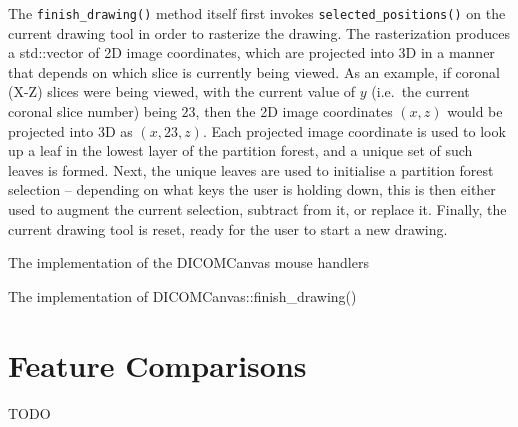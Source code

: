 The \texttt{finish_drawing()} method itself first invokes \texttt{selected_positions()} on the current drawing tool in order to rasterize the drawing. The rasterization produces a std::vector of 2D image coordinates, which are projected into 3D in a manner that depends on which slice is currently being viewed. As an example, if coronal (X-Z) slices were being viewed, with the current value of $y$ (i.e.~the current coronal slice number) being $23$, then the 2D image coordinates $(x,z)$ would be projected into 3D as $(x,23,z)$. Each projected image coordinate is used to look up a leaf in the lowest layer of the partition forest, and a unique set of such leaves is formed. Next, the unique leaves are used to initialise a partition forest selection -- depending on what keys the user is holding down, this is then either used to augment the current selection, subtract from it, or replace it. Finally, the current drawing tool is reset, ready for the user to start a new drawing.

\begin{stulisting}[p]
\caption{The implementation of the DICOMCanvas mouse handlers}
\label{code:appendixval-mousehandlers}

\end{stulisting}

\begin{stulisting}[p]
\caption{The implementation of DICOMCanvas::finish_drawing()}
\label{code:appendixval-finishdrawing}

\end{stulisting}

\newpage

\section{Feature Comparisons}

TODO
